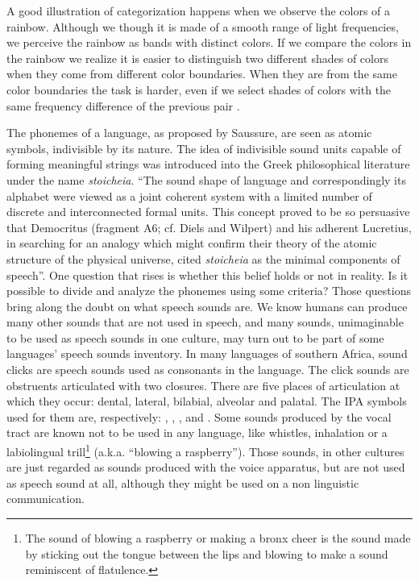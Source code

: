 A good illustration of categorization happens when we observe the colors of a rainbow. Although we though it
is made of a smooth range of light frequencies, we perceive the rainbow as bands with distinct colors.
If we compare the colors in the rainbow we realize it is easier to distinguish two different shades of colors 
when they come from different color boundaries. When they are from the same color boundaries the task
is harder, even if we select shades of colors with the same frequency difference of the previous pair \citep{korda1984}.

The phonemes of a language, as proposed by Saussure, are seen as atomic symbols, indivisible by its nature. The idea of indivisible sound units capable of forming meaningful strings was introduced into the Greek philosophical literature under the name \textit{stoicheia}. ``The sound shape of language and correspondingly its alphabet were viewed as a joint coherent system with a limited number of discrete and interconnected formal units. This concept proved to be so persuasive that Democritus (fragment A6; cf. Diels and Wilpert) and his adherent Lucretius, in searching for an analogy which might confirm their theory of the atomic structure of the physical universe, cited \textit{stoicheia} as the minimal components of speech''\citep{jakobson2002}. One question that rises is whether this belief holds or not in reality. Is it possible to divide and analyze the phonemes using some criteria? Those questions bring along the doubt on what speech sounds are. We know humans can produce many other sounds that are not used in speech, and many sounds, unimaginable to be used as speech sounds in one culture, may turn out to be part of some languages' speech sounds inventory. In many languages of southern Africa, sound clicks are speech sounds used as consonants in the language. The click sounds are obstruents articulated with two closures. There are five places of articulation at which they occur: dental, lateral, bilabial, alveolar and palatal. The IPA symbols used for them are, respectively: \textipa{[|]}, \textipa{[||]}, \textipa{[\!o]}, \textipa{[!]} and \textipa{[\textdoublebarpipe]}. Some sounds produced by the vocal tract are known not to be used in any language, like whistles, inhalation or a labiolingual trill\footnote{The sound of blowing a raspberry or making a bronx cheer is the sound made by sticking out the tongue between the lips and blowing to make a sound reminiscent of flatulence.} (a.k.a. ``blowing a raspberry''). Those sounds, in other cultures are just regarded as sounds produced with the voice apparatus, 
but are not used as speech sound at all, although they might be used on a non linguistic communication.

